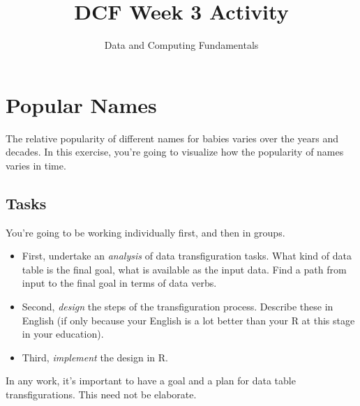 \documentclass[]{article}
\title{DCF Week 3 Activity}
\author{}
\date{Data and Computing Fundamentals}
\begin{document}
\maketitle


\section{Popular Names}\label{popular-names}

The relative popularity of different names for babies varies over the
years and decades. In this exercise, you're going to visualize how the
popularity of names varies in time.

\subsection{Tasks}\label{tasks}

You're going to be working individually first, and then in groups.

\begin{itemize}
\itemsep1pt\parskip0pt
\item
  First, undertake an \emph{analysis} of data transfiguration tasks.
  What kind of data table is the final goal, what is available as the
  input data. Find a path from input to the final goal in terms of data
  verbs.
\item
  Second, \emph{design} the steps of the transfiguration process.
  Describe these in English (if only because your English is a lot
  better than your R at this stage in your education).
\item
  Third, \emph{implement} the design in R.
\end{itemize}

In any work, it's important to have a goal and a plan for data table
transfigurations. This need not be elaborate.
\end{document}
